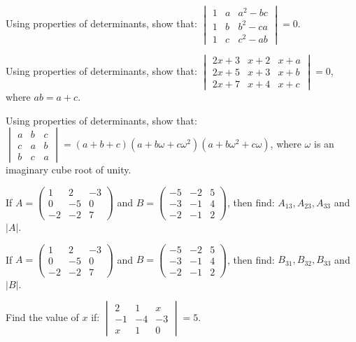 \documentclass[11pt,a4paper]{article}
\begin{document}
\begin{longlist}
\item Using properties of determinants, show that: $\begin{vmatrix}1 & a & a^2-bc\\ 1 & b & b^2-ca\\ 1 & c & c^2-ab\end{vmatrix}=0$.

\item Using properties of determinants, show that: $\begin{vmatrix}2x+3 & x+2 & x+a\\ 2x+5 & x+3 & x+b\\ 2x+7 & x+4 & x+c\end{vmatrix}=0$, where $ab=a+c$.

\item Using properties of determinants, show that: $\begin{vmatrix}a & b & c\\ c & a & b\\ b & c & a\end{vmatrix}=(a+b+c)(a+b\omega+c\omega^2)(a+b\omega^2+c\omega)$, where $\omega$ is an imaginary cube root of unity.

\item If $A=\begin{pmatrix}1 & 2 & -3\\ 0 & -5 & 0\\ -2 & -2 & 7\end{pmatrix}$ and $B=\begin{pmatrix}-5 & -2 & 5\\ -3 & -1 & 4\\ -2 & -1 & 2\end{pmatrix}$, then find: $A_{13},A_{23},A_{33}$ and $|A|$.

\item If $A=\begin{pmatrix}1 & 2 & -3\\ 0 & -5 & 0\\ -2 & -2 & 7\end{pmatrix}$ and $B=\begin{pmatrix}-5 & -2 & 5\\ -3 & -1 & 4\\ -2 & -1 & 2\end{pmatrix}$, then find: $B_{31},B_{32},B_{33}$ and $|B|$.

\item Find the value of $x$ if: $\begin{vmatrix}2 & 1 & x\\ -1 & -4 & -3\\ x & 1 & 0\end{vmatrix}=5$.


\end{longlist}
\end{document}
